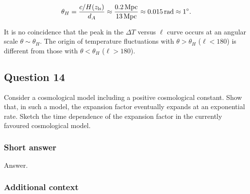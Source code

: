 \documentclass[a4paper,11pt]{article}
\begin{document}
\begin{align*}
    \theta_H = \frac{c/H(z_\mathrm{ls})}{d_A} \approx \frac{0.2\,{\rm Mpc}}{13\,{\rm Mpc}} \approx 0.015\,{\rm rad} \approx 1^\circ.
\end{align*}

{\noindent}It is no coincidence that the peak in the $\Delta T$ versus $\ell$ curve occurs at an angular scale $θ\sim\theta_H$. The origin of temperature fluctuations with $\theta>\theta_H$ ($\ell<180$) is different from those with $\theta<\theta_H$ ($\ell>180$).


%
%

\newpage
\subsection{Question 14}

Consider a cosmological model including a positive cosmological constant. Show that, in such a model, the expansion factor eventually expands at an exponential rate. Sketch the time dependence of the expansion factor in the currently favoured cosmological model.

\subsubsection{Short answer}

Answer.

\subsubsection{Additional context}
\end{document}
